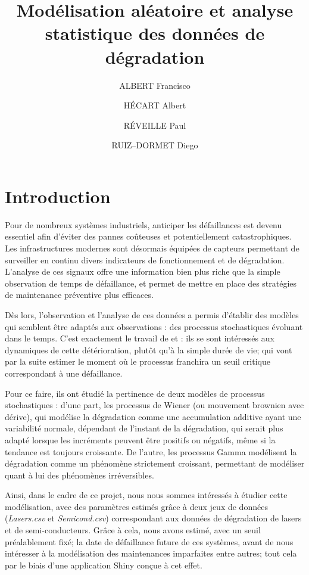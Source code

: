 \documentclass[11pt,a4paper]{article}
\title{Modélisation aléatoire et analyse statistique des données de dégradation}
\author{ALBERT Francisco \and HÉCART Albert \and RÉVEILLE Paul \and RUIZ--DORMET Diego}
\begin{document}
\maketitle

\tableofcontents

\section{Introduction}

Pour de nombreux systèmes industriels, anticiper les défaillances est devenu essentiel afin d’éviter des pannes coûteuses et potentiellement catastrophiques. Les infrastructures modernes sont désormais équipées de capteurs permettant de surveiller en continu divers indicateurs de fonctionnement et de dégradation. L’analyse de ces signaux offre une information bien plus riche que la simple observation de temps de défaillance, et permet de mettre en place des stratégies de maintenance préventive plus efficaces.

Dès lors, l'observation et l'analyse de ces données a permis d'établir des modèles qui semblent être adaptés aux observations : des processus stochastiques évoluant dans le temps. C'est exactement le travail de \cite{KMP} et \cite{XIE}: ils se sont intéressés aux dynamiques de cette détérioration, plutôt qu'à la simple durée de vie; qui vont par la suite estimer le moment où le processus franchira un seuil critique correspondant à une défaillance.

Pour ce faire, ils ont étudié la pertinence de deux modèles de processus stochastiques : d'une part, les processus de Wiener (ou mouvement brownien avec dérive), qui modélise la dégradation comme une accumulation additive ayant une variabilité normale, dépendant de l'instant de la dégradation, qui serait plus adapté lorsque les incréments peuvent être positifs ou négatifs, même si la tendance est toujours croissante. De l'autre, les processus Gamma modélisent la dégradation comme un phénomène strictement croissant, permettant de modéliser quant à lui des phénomènes irréversibles.

Ainsi, dans le cadre de ce projet, nous nous sommes intéressés à étudier cette modélisation, avec des paramètres estimés grâce à deux jeux de données (\textit{Lasers.csv} et \textit{Semicond.csv}) correspondant aux données de dégradation de lasers et de semi-conducteurs. Grâce à cela, nous avons estimé, avec un seuil préalablement fixé; la date de défaillance future de ces systèmes, avant de nous intéresser à la modélisation des maintenances imparfaites entre autres; tout cela par le biais d'une application Shiny conçue à cet effet.
\end{document}
